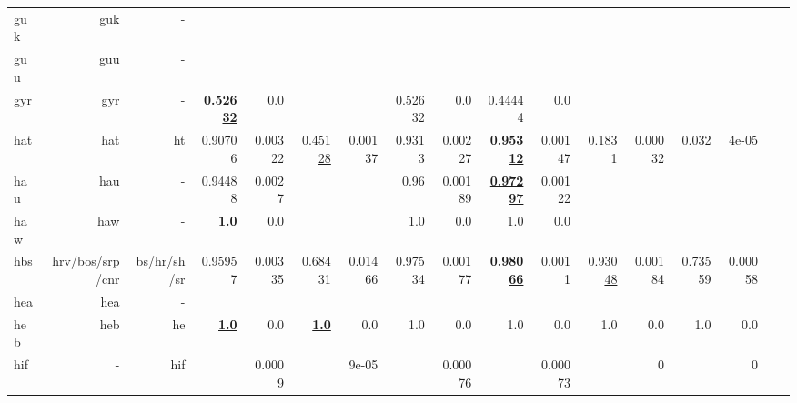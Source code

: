 \documentclass[11pt]{article}
\begin{document}
\begin{table*}[h]
{\begin{tabular}{lrrrrrrrrrrrrrrrr}
guk         & guk         & -         &          &          &          &          &          &          &          &          &          &          &          &          \\
guu         & guu         & -         &          &          &          &          &          &          &          &          &          &          &          &          \\
gyr         & gyr         & -         & \textbf{\underline{0.52632}}         & 0.0         &          &          & 0.52632         & 0.0         & 0.44444         & 0.0         &          &          &          &          \\
hat         & hat         & ht         & 0.90706         & 0.00322         & \underline{0.45128}         & 0.00137         & 0.9313         & 0.00227         & \textbf{\underline{0.95312}}         & 0.00147         & 0.1831         & 0.00032         & 0.032         & 4e-05         \\
hau         & hau         & -         & 0.94488         & 0.0027         &          &          & 0.96         & 0.00189         & \textbf{\underline{0.97297}}         & 0.00122         &          &          &          &          \\
haw         & haw         & -         & \textbf{\underline{1.0}}         & 0.0         &          &          & 1.0         & 0.0         & 1.0         & 0.0         &          &          &          &          \\
hbs         & hrv/bos/srp/cnr         & bs/hr/sh/sr         & 0.95957         & 0.00335         & 0.68431         & 0.01466         & 0.97534         & 0.00177         & \textbf{\underline{0.98066}}         & 0.0011         & \underline{0.93048}         & 0.00184         & 0.73559         & 0.00058         \\
hea         & hea         & -         &          &          &          &          &          &          &          &          &          &          &          &          \\
heb         & heb         & he         & \textbf{\underline{1.0}}         & 0.0         & \textbf{\underline{1.0}}         & 0.0         & 1.0         & 0.0         & 1.0         & 0.0         & 1.0         & 0.0         & 1.0         & 0.0         \\
hif         & -         & hif         &          & 0.0009         &          & 9e-05         &          & 0.00076         &          & 0.00073         &          & 0         &          & 0         \\

\end{tabular}}
\end{table*}
\end{document}
